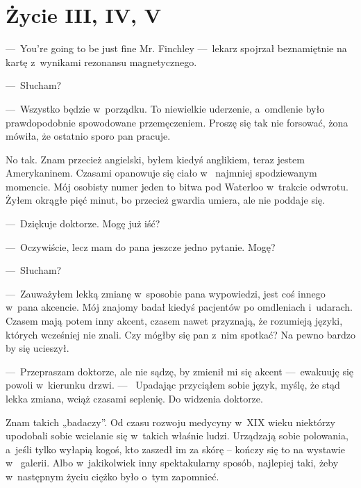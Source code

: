 \chapter{Życie III, IV, V}

---~You're going to be just fine Mr. Finchley ---~lekarz spojrzał beznamiętnie na kartę z~wynikami rezonansu 
magnetycznego.

---~Słucham?

---~Wszystko będzie w~porządku. To niewielkie uderzenie, a~omdlenie było prawdopodobnie spowodowane przemęczeniem. 
Proszę się tak nie forsować, żona mówiła, że ostatnio sporo pan pracuje.

No tak. Znam przecież angielski, byłem kiedyś anglikiem, teraz jestem Amerykaninem. Czasami opanowuje się ciało w~
najmniej spodziewanym momencie. Mój osobisty numer jeden to bitwa pod Waterloo w~trakcie odwrotu. Żyłem okrągłe pięć 
minut, bo przecież gwardia umiera, ale nie poddaje się.

---~Dziękuje doktorze. Mogę już iść?

---~Oczywiście, lecz mam do pana jeszcze jedno pytanie. Mogę?

---~Słucham?

---~Zauważyłem lekką zmianę w~sposobie pana wypowiedzi, jest coś innego w~pana akcencie. Mój znajomy badał kiedyś 
pacjentów po omdleniach i~udarach. Czasem mają potem inny akcent, czasem nawet przyznają, że rozumieją języki, 
których wcześniej nie znali. Czy mógłby się pan z~nim spotkać? Na pewno bardzo by się ucieszył.

---~Przepraszam doktorze, ale nie sądzę, by zmienił mi się akcent ---~ewakuuję się powoli w~kierunku drzwi. ---~
Upadając przyciąłem sobie język, myślę, że stąd lekka zmiana, wciąż czasami seplenię. Do widzenia doktorze.

\paraSep

Znam takich „badaczy”. Od czasu rozwoju medycyny w~XIX wieku niektórzy upodobali sobie wcielanie się w~takich właśnie 
ludzi. Urządzają sobie polowania, a~jeśli tylko wyłapią kogoś, kto zaszedł im za skórę -- kończy się to na wystawie w~
galerii. Albo w~jakikolwiek inny spektakularny sposób, najlepiej taki, żeby w~następnym życiu ciężko było o~tym 
zapomnieć.

